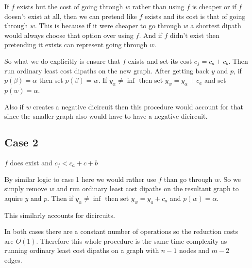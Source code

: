 \documentclass{article}
\begin{document}
If $f$ exists but the cost of going through $w$ rather than using $f$ is cheaper or if $f$ doesn't exist at all, then we can pretend like $f$ exists and its cost is that of going through $w$. This is because if it were cheaper to go through $w$ a shortest dipath would always choose that option over using $f$. And if $f$ didn't exist then pretending it exists can represent going through $w$. 

So what we do explicitly is ensure that $f$ exists and set its cost $c_f = c_a + c_b$. Then run ordinary least cost dipaths on the new graph. After getting back $y$ and $p$, if $p(\beta) = \alpha$ then set $p(\beta) = w$. If $y_\alpha \neq \inf$ then set $y_w = y_\alpha + c_a$ and set $p(w) = \alpha$.

Also if $w$ creates a negative dicircuit then this procedure would account for that since the smaller graph also would have to have a negative dicircuit.

\subsection*{Case 2}
$f$ does exist and $c_f < c_a + c+b$

By similar logic to case 1 here we would rather use $f$ than go through $w$. So we simply remove $w$ and run ordinary least cost dipaths on the resultant graph to aquire $y$ and $p$. Then if $y_\alpha \neq \inf$ then set $y_w = y_a + c_a$ and $p(w) = \alpha$. 

This similarly accounts for dicircuits. 

In both cases there are a constant number of operations so the reduction costs are $O(1)$. Therefore this whole procedure is the same time complexity as running ordinary least cost dipaths on a graph with $n-1$ nodes and $m-2$ edges. 
\end{document}
